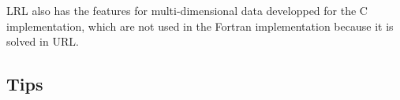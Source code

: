 

LRL also has the features for multi-dimensional data developped for the C 
implementation, which are not used in the Fortran implementation because
it is solved in URL.



\subsection{Tips}


